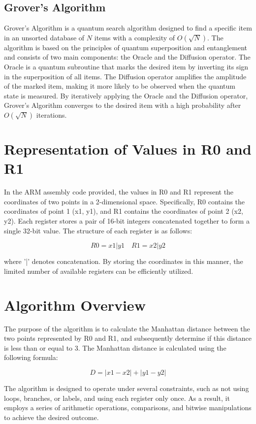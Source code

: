 \subsection{Grover's Algorithm}
Grover's Algorithm \cite{grover1996fast} is a quantum search algorithm designed to find a specific item in an unsorted database of $N$ items with a complexity of $O(\sqrt{N})$. The algorithm is based on the principles of quantum superposition and entanglement and consists of two main components: the Oracle and the Diffusion operator. The Oracle is a quantum subroutine that marks the desired item by inverting its sign in the superposition of all items. The Diffusion operator amplifies the amplitude of the marked item, making it more likely to be observed when the quantum state is measured. By iteratively applying the Oracle and the Diffusion operator, Grover's Algorithm converges to the desired item with a high probability after $O(\sqrt{N})$ iterations.



\section{Representation of Values in R0 and R1}

In the ARM assembly code provided, the values in R0 and R1 represent the coordinates of two points in a 2-dimensional space. Specifically, R0 contains the coordinates of point 1 (x1, y1), and R1 contains the coordinates of point 2 (x2, y2). Each register stores a pair of 16-bit integers concatenated together to form a single 32-bit value. The structure of each register is as follows:

\[
R0 = x1 | y1 \quad R1 = x2 | y2
\]

where '|' denotes concatenation. By storing the coordinates in this manner, the limited number of available registers can be efficiently utilized.

\section{Algorithm Overview}

The purpose of the algorithm is to calculate the Manhattan distance between the two points represented by R0 and R1, and subsequently determine if this distance is less than or equal to 3. The Manhattan distance is calculated using the following formula:

\[
D = |x1 - x2| + |y1 - y2|
\]

The algorithm is designed to operate under several constraints, such as not using loops, branches, or labels, and using each register only once. As a result, it employs a series of arithmetic operations, comparisons, and bitwise manipulations to achieve the desired outcome.

